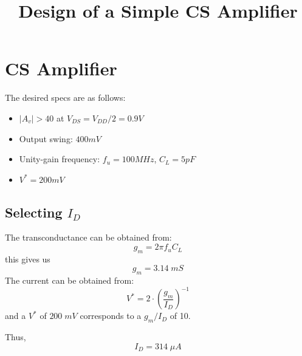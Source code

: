 \documentclass[conference]{IEEEtran}
\begin{document}
 


\title{Design of a Simple CS Amplifier}

\author{
}

\maketitle

\section{CS Amplifier} 
\noindent The desired specs are as follows:
\begin{itemize}
	\item $|A_v|>40$ at $V_{DS}=V_{DD}/2=0.9V$
	\item Output swing: $400mV$
	\item Unity-gain frequency: $f_u=100MHz$, $C_L=5pF$
	\item $V^{*}=200mV$
\end{itemize}
\subsection{Selecting $I_D$}
The transconductance can be obtained from:
\begin{equation*}
	g_m = 2\pi f_u C_L
\end{equation*}
this gives us
\begin{equation*}
	g_m = 3.14\; mS
\end{equation*}
The current can be obtained from: 
\begin{equation*}
	V^* = 2\cdot\left( \frac{g_m}{I_D}\right)^{-1} 
\end{equation*} 
and a $V^*$ of $200\; mV$ corresponds to a $g_m/I_D$ of 10. 

\vspace{8pt}
\noindent Thus, 
\begin{equation*}
	I_D = 314\; \mu A
\end{equation*}
\end{document}
